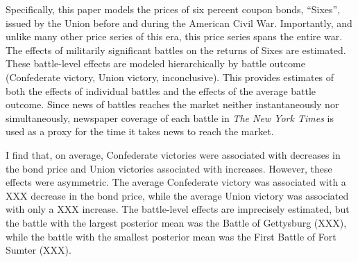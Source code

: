 \documentclass[11pt, oneside, article]{memoir}
\begin{document}
Specifically, this paper models the prices of six percent coupon bonds, ``Sixes'', issued by the Union before and during the American Civil War.
Importantly, and unlike many other price series of this era, this price series spans the entire war.
The effects of \AcwBattleNumSigA{} militarily significant battles on the returns of Sixes are estimated.
These battle-level effects are modeled hierarchically by battle outcome (Confederate victory, Union victory, inconclusive).
This provides estimates of both the effects of individual battles and the effects of the average battle outcome.
Since news of battles reaches the market neither instantaneously nor simultaneously, newspaper coverage of each battle in \textit{The New York Times} is used as a proxy for the time it takes news to reach the market.

I find that, on average, Confederate victories were associated with decreases in the bond price and Union victories associated with  increases.
However, these effects were asymmetric. The average Confederate victory was associated with a XXX decrease in the bond price, while the average Union victory was associated with only a XXX increase.
The battle-level effects are imprecisely estimated, but the battle with the largest posterior mean was the Battle of Gettysburg (XXX), while the battle with the smallest posterior mean was the First Battle of Fort Sumter (XXX).
\end{document}
